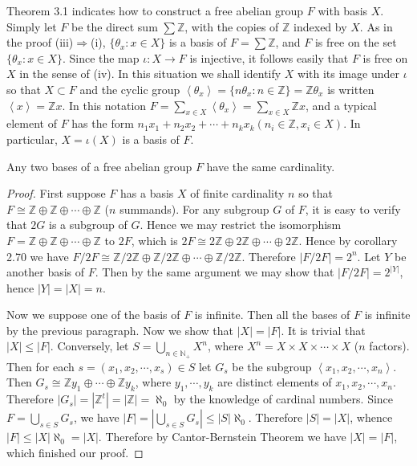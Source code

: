 Theorem 3.1 indicates how to construct a free abelian group $F$ with basis $X$. Simply let $F$ be the direct sum $\sum\mathbb{Z}$, with the copies of $\mathbb{Z}$ indexed by $X$. As in the proof (iii)$\Rightarrow$(i), $\{\theta_x:x\in X\}$ is a basis of $F=\sum\mathbb{Z}$, and $F$ is free on the set $\{\theta_x:x\in X\}$. Since the map $\iota:X\to F$ is injective, it follows easily that $F$ is free on $X$ in the sense of (iv). In this situation we shall identify $X$ with its image under $\iota$ so that $X\subset F$ and the cyclic group $\left<\theta_x\right>=\{n\theta_x:n\in\mathbb{Z}\}=\mathbb{Z}\theta_x$ is written $\left<x\right>=\mathbb{Z}x$. In this notation $F=\sum_{x\in X}\left<\theta_x\right>=\sum_{x\in X}\mathbb{Z}x$, and a typical element of $F$ has the form $n_1x_1+n_2x_2+\cdots+n_kx_k(n_i\in\mathbb{Z},x_i\in X)$. In particular, $X=\iota(X)$ is a basis of $F$.
\begin{theorem}
Any two bases of a free abelian group $F$ have the same cardinality.
\end{theorem}
\begin{proof}
First suppose $F$ has a basis $X$ of finite cardinality $n$ so that $F\cong\mathbb{Z}\oplus\mathbb{Z}\oplus\cdots\oplus\mathbb{Z}$ ($n$ summands). For any subgroup $G$ of $F$, it is easy to verify that $2G$ is a subgroup of $G$. Hence we may restrict the isomorphism $F=\mathbb{Z}\oplus\mathbb{Z}\oplus\cdots\oplus\mathbb{Z}$ to $2F$, which is $2F\cong2\mathbb{Z}\oplus2\mathbb{Z}\oplus\cdots\oplus2\mathbb{Z}$. Hence by corollary 2.70 we have $F/2F\cong\mathbb{Z}/2\mathbb{Z}\oplus\mathbb{Z}/2\mathbb{Z}\oplus\cdots\oplus\mathbb{Z}/2\mathbb{Z}$. Therefore $|F/2F|=2^n$. Let $Y$ be another basis of $F$. Then by the same argument we may show that $|F/2F|=2^{|Y|}$, hence $|Y|=|X|=n$.\par
Now we suppose one of the basis of $F$ is infinite. Then all the bases of $F$ is infinite by the previous paragraph. Now we show that $|X|=|F|$. It is trivial that $|X|\le |F|$. Conversely, let $S=\bigcup_{n\in\mathbb{N}_+}X^n$, where $X^n=X\times X\times\cdots\times X$ ($n$ factors). Then for each $s=(x_1,x_2,\cdots,x_s)\in S$ let $G_s$ be the subgroup $\left<x_1,x_2,\cdots,x_n\right>$. Then $G_s\cong\mathbb{Z}y_1\oplus\cdots\oplus\mathbb{Z}y_k$, where $y_1,\cdots,y_k$ are distinct elements of $x_1,x_2,\cdots,x_n$. Therefore $|G_s|=|\mathbb{Z}^t|=|\mathbb{Z}|=\aleph_0$ by the knowledge of cardinal numbers. Since $F=\bigcup_{s\in S}G_s$, we have $|F|=\left|\bigcup_{s\in S}G_s\right|\le|S|\aleph_0$. Therefore $|S|=|X|$, whence $|F|\le|X|\aleph_0=|X|$. Therefore by Cantor-Bernstein Theorem we have $|X|=|F|$, which finished our proof.
\end{proof}
